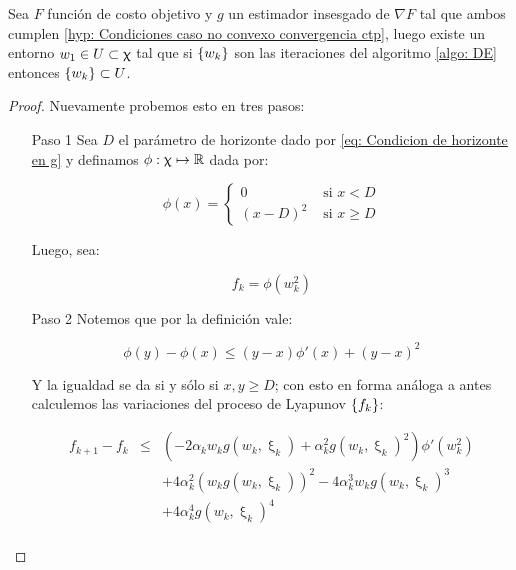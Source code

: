 \begin{theorem}
	\label{theorem: Acotaci\'on global del algoritmo estoc\'astico insesgado}
	Sea $F$ funci\'on de costo objetivo y $g$ un estimador insesgado de $\nabla F$ tal que ambos cumplen \ref{hyp: Condiciones caso no convexo convergencia ctp}, luego existe un entorno $w_1 \in U \subset \upchi$ tal que si $\left\lbrace w_k\right\rbrace$ son las iteraciones del algoritmo \ref{algo: DE} entonces $\left\lbrace w_k\right\rbrace \subset U$.
\end{theorem}

\begin{proof}
	Nuevamente probemos esto en tres pasos:
	
	\begin{enumerate}
		\item [Paso 1] Sea $D$ el par\'ametro de horizonte dado por \ref{eq: Condicion de horizonte en g} y definamos $\phi: \upchi \mapsto {\mathbb{R}}$ dada por:
		
		\begin{equation*}
		\phi(x) = \left\lbrace
		\begin{array}{cc}
		 0 & \text{ si } x < D \\
		 (x - D)^2 & \text{ si } x \geq D
		\end{array}\right.
		\end{equation*}
		
		Luego, sea:
		
		\begin{equation*}
			f_k = \phi\left(w_k^2\right)
		\end{equation*}
		
		\item [Paso 2] Notemos que por la definici\'on vale:
		
		\begin{equation*}
			\phi(y) - \phi(x) \leq \left(y - x\right)\phi\prime(x) + \left(y-x\right)^2
		\end{equation*}
		
		Y la igualdad se da si y s\'olo si $x,y \geq D$; con esto en forma an\'aloga a antes calculemos las variaciones del proceso de Lyapunov $\left\lbrace f_k\right\rbrace$:
		
		\begin{equation}
		\label{eq: Condicion de proceso de lyapunov, confinamiento global}
		\begin{array}{rcl}
			f_{k+1} - f_k & \leq & \left(-2 \alpha_k w_k g(w_k, \upxi_{k}) + \alpha_k^2 g(w_k, \upxi_{k})^2\right) \phi'(w_k^2) \\ 
			& & + 4 \alpha_k^2 \left(w_kg(w_k, \upxi_{k})\right)^2 -4 \alpha_k^3 w_k g(w_k, \upxi_{k})^3 \\
			 & &  + 4 \alpha_k^4g(w_k, \upxi_{k})^4 \\
		\end{array}
		\end{equation}
		

\end{enumerate}
\end{proof}
